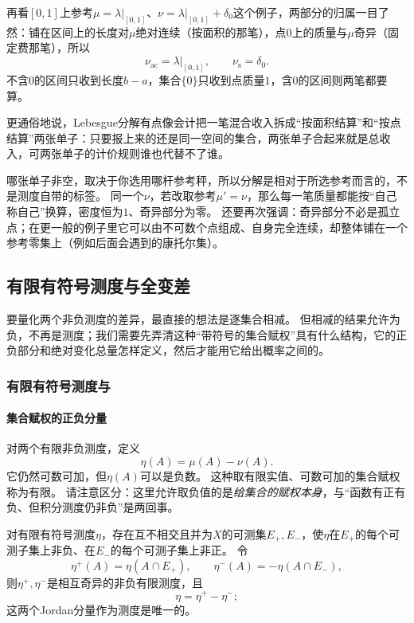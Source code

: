 再看$[0,1]$上参考$\mu=\lambda|_{[0,1]}$、$\nu=\lambda|_{[0,1]}+\delta_0$这个例子，两部分的归属一目了然：铺在区间上的长度对$\mu$绝对连续（按面积的那笔），点$0$上的质量与$\mu$奇异（固定费那笔），所以
\[
 \nu_{\mathrm{ac}}=\lambda|_{[0,1]},\qquad \nu_{\mathrm s}=\delta_0.
\]
不含$0$的区间只收到长度$b-a$，集合$\{0\}$只收到点质量$1$，含$0$的区间则两笔都要算。

更通俗地说，Lebesgue分解有点像会计把一笔混合收入拆成“按面积结算”和“按点结算”两张单子：只要报上来的还是同一空间的集合，两张单子合起来就是总收入，可两张单子的计价规则谁也代替不了谁。

哪张单子非空，取决于你选用哪杆参考秤，所以分解是相对于所选参考而言的，不是测度自带的标签。
同一个$\nu$，若改取参考$\mu'=\nu$，那么每一笔质量都能按“自己称自己”换算，密度恒为$1$、奇异部分为零。
还要再次强调：奇异部分不必是孤立点；在更一般的例子里它可以由不可数个点组成、自身完全连续，却整体铺在一个参考零集上（例如后面会遇到的康托尔集）。

\subsection{有限有符号测度与全变差}

要量化两个非负测度的差异，最直接的想法是逐集合相减。
但相减的结果允许为负，不再是测度；我们需要先弄清这种“带符号的集合赋权”具有什么结构，它的正负部分和绝对变化总量怎样定义，然后才能用它给出概率之间的。

\subsubsection{有限有符号测度与}
\label{sec:measure-signed-total-variation}

\paragraph{集合赋权的正负分量}

对两个有限非负测度，定义
\[
 \eta(A)=\mu(A)-\nu(A).
\]
它仍然可数可加，但$\eta(A)$可以是负数。
这种取有限实值、可数可加的集合赋权称为有限。
请注意区分：这里允许取负值的是\emph{给集合的赋权本身}，与“函数有正有负、但积分测度仍非负”是两回事。

\begin{theorem}
\label{thm:measure-hahn-jordan}
对有限有符号测度$\eta$，存在互不相交且并为$X$的可测集$E_+,E_-$，使$\eta$在$E_+$的每个可测子集上非负、在$E_-$的每个可测子集上非正。
令
\[
 \eta^+(A)=\eta(A\cap E_+),\qquad
 \eta^-(A)=-\eta(A\cap E_-),
\]
则$\eta^+,\eta^-$是相互奇异的非负有限测度，且
\[
 \eta=\eta^+-\eta^-;
\]
这两个Jordan分量作为测度是唯一的。
\end{theorem}

